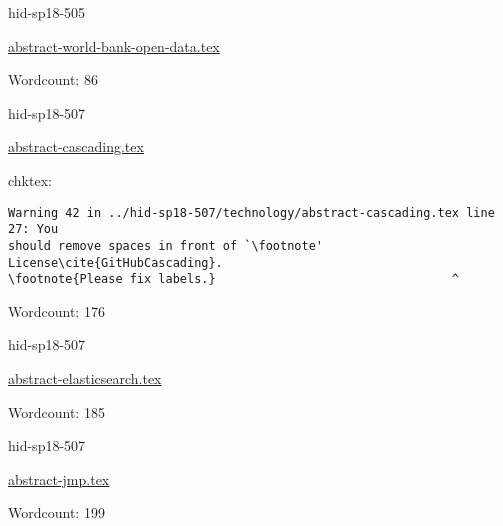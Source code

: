 \begin{IU}

hid-sp18-505

\href{https://github.com/cloudmesh-community/hid-sp18-505/blob/master//technology/abstract-world-bank-open-data.tex}{abstract-world-bank-open-data.tex}

 

Wordcount: 86

\end{IU}



\begin{IU}

hid-sp18-507

\href{https://github.com/cloudmesh-community/hid-sp18-507/blob/master//technology/abstract-cascading.tex}{abstract-cascading.tex}

 
chktex:
\begin{tiny}
\begin{verbatim}
Warning 42 in ../hid-sp18-507/technology/abstract-cascading.tex line 27: You
should remove spaces in front of `\footnote' License\cite{GitHubCascading}.
\footnote{Please fix labels.}                                 ^
\end{verbatim}
\end{tiny}

Wordcount: 176

\end{IU}



\begin{IU}

hid-sp18-507

\href{https://github.com/cloudmesh-community/hid-sp18-507/blob/master//technology/abstract-elasticsearch.tex}{abstract-elasticsearch.tex}

 

Wordcount: 185

\end{IU}



\begin{IU}

hid-sp18-507

\href{https://github.com/cloudmesh-community/hid-sp18-507/blob/master//technology/abstract-jmp.tex}{abstract-jmp.tex}

 

Wordcount: 199

\end{IU}

